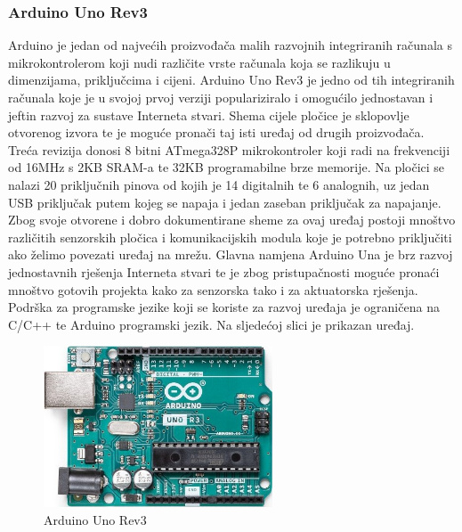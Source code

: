 \documentclass[times, utf8, diplomski]{fer}
\begin{document}
\subsubsection{Arduino Uno Rev3}
Arduino je jedan od najvećih proizvođača malih razvojnih integriranih računala s mikrokontrolerom koji nudi različite vrste računala koja se razlikuju u dimenzijama, priključcima i cijeni. Arduino Uno Rev3\citep{ArduinoUno} je jedno od tih integriranih računala koje je u svojoj prvoj verziji populariziralo i omogućilo jednostavan i jeftin razvoj za sustave Interneta stvari. Shema cijele pločice je sklopovlje otvorenog izvora te je moguće pronači taj isti uređaj od drugih proizvođača. Treća revizija donosi 8 bitni ATmega328P mikrokontroler koji radi na frekvenciji od 16MHz s 2KB SRAM-a te 32KB programabilne brze memorije. Na pločici se nalazi 20 priključnih pinova od kojih je 14 digitalnih te 6 analognih, uz jedan USB priključak putem kojeg se napaja i jedan zaseban priključak za napajanje. Zbog svoje otvorene i dobro dokumentirane sheme za ovaj uređaj postoji mnoštvo različitih senzorskih pločica i komunikacijskih modula koje je potrebno priključiti ako želimo povezati uređaj na mrežu. Glavna namjena Arduino Una je brz razvoj jednostavnih rješenja Interneta stvari te je zbog pristupačnosti moguće pronaći mnoštvo gotovih projekta kako za senzorska tako i za aktuatorska rješenja. Podrška za programske jezike koji se koriste za razvoj uređaja je ograničena na C/C++ te Arduino programski jezik. Na sljedećoj slici je prikazan uređaj. 
\begin{figure}[htb]
    \centering
    \includegraphics[width=6.8cm]{images/arduinouno.jpg}
    \caption{Arduino Uno Rev3\citep{ArduinoUno}}
    \label{fig:arduinouno}
\end{figure}
\end{document}
